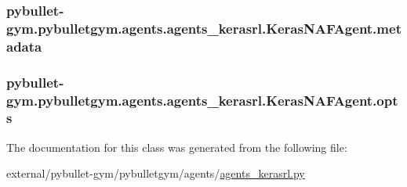 \subsubsection[{\texorpdfstring{metadata}{metadata}}]{\setlength{\rightskip}{0pt plus 5cm}pybullet-\/gym.\+pybulletgym.\+agents.\+agents\+\_\+kerasrl.\+Keras\+N\+A\+F\+Agent.\+metadata}\hypertarget{classpybullet-gym_1_1pybulletgym_1_1agents_1_1agents__kerasrl_1_1_keras_n_a_f_agent_a051d0c849f9cf8c1073bdb5a9d870cd1}{}\label{classpybullet-gym_1_1pybulletgym_1_1agents_1_1agents__kerasrl_1_1_keras_n_a_f_agent_a051d0c849f9cf8c1073bdb5a9d870cd1}
\subsubsection[{\texorpdfstring{opts}{opts}}]{\setlength{\rightskip}{0pt plus 5cm}pybullet-\/gym.\+pybulletgym.\+agents.\+agents\+\_\+kerasrl.\+Keras\+N\+A\+F\+Agent.\+opts}\hypertarget{classpybullet-gym_1_1pybulletgym_1_1agents_1_1agents__kerasrl_1_1_keras_n_a_f_agent_a159eaf022c1e5583a097ab3798b3ee00}{}\label{classpybullet-gym_1_1pybulletgym_1_1agents_1_1agents__kerasrl_1_1_keras_n_a_f_agent_a159eaf022c1e5583a097ab3798b3ee00}


The documentation for this class was generated from the following file\+:\begin{DoxyCompactItemize}
\item 
external/pybullet-\/gym/pybulletgym/agents/\hyperlink{agents__kerasrl_8py}{agents\+\_\+kerasrl.\+py}\end{DoxyCompactItemize}
